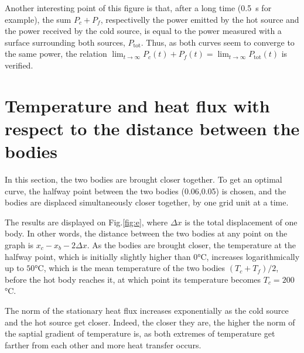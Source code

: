 \documentclass[a4paper,12pt,twoside]{article}
\begin{document}
Another interesting point of this figure is that, after a long time (\SI{0.5}{\second} for example), the sum $P_c + P_f$, respectivelly the power emitted by the hot source and the power received by the cold source, is equal to the power measured with a surface surrounding both sources, $P_\text{tot}$.
Thus, as both curves seem to converge to the same power, the relation $\lim_{t\rightarrow\infty}P_c(t) + P_f(t) = \lim_{t\rightarrow\infty}P_\text{tot}(t)$ is verified.

\section{Temperature and heat flux with respect to the distance between the bodies}

In this section, the two bodies are brought closer together. To get an optimal curve, the halfway point between the two bodies (0.06,0.05) is chosen, and the bodies are displaced simultaneously closer together, by one grid unit at a time.

The results are displayed on Fig.\ref{fig:e}, where $\Delta x$ is the total displacement of one body. In other words, the distance between the two bodies at any point on the graph is $x_c-x_b-2\Delta x$. As the bodies are brought closer, the temperature at the halfway point, which is initially slightly higher than $0$°C, increases logarithmically up to $50$°C, which is the mean temperature of the two bodies $(T_c+T_f)/2$, before the hot body reaches it, at which point its temperature becomes $T_c=200$°C.

The norm of the stationary heat flux increases exponentially as the cold source and the hot source get closer. Indeed, the closer they are, the higher the norm of the saptial gradient of temperature is, as both extremes of temperature get farther from each other and more heat transfer occurs.
\end{document}
